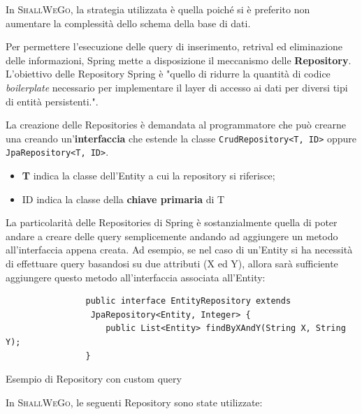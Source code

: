         In \textsc{ShallWeGo}, la strategia utilizzata è quella  poiché si è preferito non aumentare la complessità dello schema della base di dati.

        Per permettere l'esecuzione delle query di inserimento, retrival ed eliminazione delle informazioni, Spring mette a disposizione il meccanismo delle \textbf{Repository}. L'obiettivo delle Repository Spring è "quello di ridurre la quantità di codice \textit{boilerplate} necessario per implementare il layer di accesso ai dati per diversi tipi di entità persistenti.".

        La creazione delle Repositories è demandata al programmatore che può crearne una creando un'\textbf{interfaccia} che estende la classe \texttt{CrudRepository<T, ID>} oppure \\ \texttt{JpaRepository<T, ID>}.

        \begin{itemize}
            \item \textbf{T} indica la classe dell'Entity a cui la repository si riferisce;
            \item ID indica la classe della \textbf{chiave primaria} di T
        \end{itemize}

        La particolarità delle Repositories di Spring è sostanzialmente quella di poter andare a creare delle query semplicemente andando ad aggiungere un metodo all'interfaccia appena creata. Ad esempio, se nel caso di un'Entity si ha necessità di effettuare query basandosi su due attributi (X ed Y), allora sarà sufficiente aggiungere questo metodo all'interfaccia associata all'Entity:

        \begin{code}
            \begin{verbatim}
                public interface EntityRepository extends
                 JpaRepository<Entity, Integer> {
                    public List<Entity> findByXAndY(String X, String Y);
                }
            \end{verbatim}
            \caption{Esempio di Repository con custom query}
        \end{code}

        In \textsc{ShallWeGo}, le seguenti Repository sono state utilizzate:

